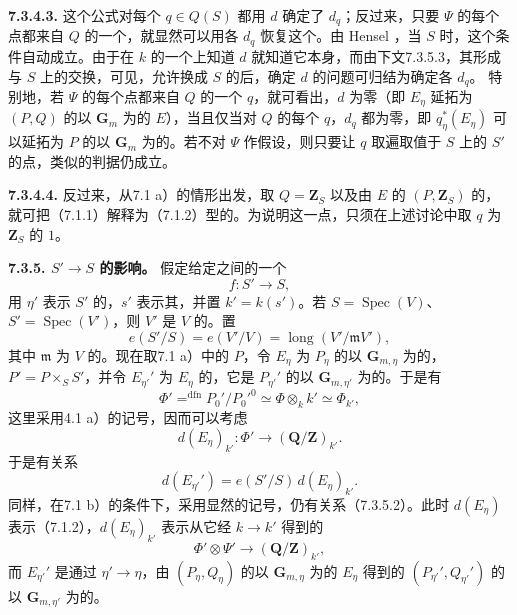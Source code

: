 \textbf{7.3.4.3.} 这个公式对每个 $q\in Q(S)$ 都用 $d$ 确定了 $d_q$；反过来，只要 $\Psi$ 的每个点都来自 $Q$ 的一个，就显然可以用各 $d_q$ 恢复这个。由 Hensel ，当 $S$ 时，这个条件自动成立。由于在 $k$ 的一个上知道 $d$ 就知道它本身，而由下文7.3.5.3，其形成与 $S$ 上的交换，可见，允许换成 $S$ 的后，确定 $d$ 的问题可归结为确定各 $d_q$。
特别地，若 $\Psi$ 的每个点都来自 $Q$ 的一个 $q$，就可看出，$d$ 为零（即 $E_\eta$ 延拓为 $(P,Q)$ 的以 $\mathbf G_m$ 为的 $E$），当且仅当对 $Q$ 的每个 $q$，$d_q$ 都为零，即 $q_\eta^*(E_\eta)$ 可以延拓为 $P$ 的以 $\mathbf G_m$ 为的。若不对 $\Psi$ 作假设，则只要让 $q$ 取遍取值于 $S$ 上的 $S'$ 的点，类似的判据仍成立。

\textbf{7.3.4.4.} 反过来，从7.1 a）的情形出发，取 $Q=\mathbf Z_S$ 以及由 $E$ 的 $(P,\mathbf Z_S)$ 的，就可把（7.1.1）解释为（7.1.2）型的。为说明这一点，只须在上述讨论中取 $q$ 为 $\mathbf Z_S$ 的 $1$。

\textbf{7.3.5.  $S'\to S$ 的影响。} 假定给定之间的一个
\[
f:S'\longrightarrow S,
\]
用 $\eta'$ 表示 $S'$ 的，$s'$ 表示其，并置 $k'=k(s')$。若 $S=\operatorname{Spec}(V)$、$S'=\operatorname{Spec}(V')$，则 $V'$ 是 $V$ 的。置
\[
e(S'/S)=e(V'/V)=\operatorname{long}(V'/\mathfrak mV'),\tag{7.3.5.1}
\]
其中 $\mathfrak m$ 为 $V$ 的。现在取7.1 a）中的 $P$，令 $E_\eta$ 为 $P_\eta$ 的以 $\mathbf G_{m,\eta}$ 为的，$P'=P\times_S S'$，并令 $E_{\eta'}'$ 为 $E_\eta$ 的，它是 $P_{\eta'}'$ 的以 $\mathbf G_{m,\eta'}$ 为的。于是有
\[
\Phi'\mathrel{\mathop=^{\mathrm{dfn}}}P_0'/P_0'^0\simeq
\Phi\otimes_k k'\simeq\Phi_{k'},
\]
这里采用4.1 a）的记号，因而可以考虑
\[
d(E_\eta)_{k'}:\Phi'\longrightarrow(\mathbf Q/\mathbf Z)_{k'}.
\]
于是有关系
\[
d(E_{\eta'}')=e(S'/S)\,d(E_\eta)_{k'}.\tag{7.3.5.2}
\]
同样，在7.1 b）的条件下，采用显然的记号，仍有关系（7.3.5.2）。此时 $d(E_\eta)$ 表示（7.1.2），$d(E_\eta)_{k'}$ 表示从它经 $k\to k'$ 得到的
\[
\Phi'\otimes\Psi'\longrightarrow(\mathbf Q/\mathbf Z)_{k'},
\]
而 $E_{\eta'}'$ 是通过 $\eta'\to\eta$，由 $(P_\eta,Q_\eta)$ 的以 $\mathbf G_{m,\eta}$ 为的 $E_\eta$ 得到的 $(P_{\eta'}',Q_{\eta'}')$ 的以 $\mathbf G_{m,\eta'}$ 为的。

